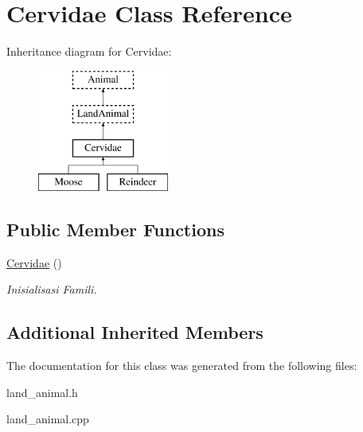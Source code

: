 \hypertarget{class_cervidae}{}\section{Cervidae Class Reference}
\label{class_cervidae}
Inheritance diagram for Cervidae\+:\begin{figure}[H]
\begin{center}
\leavevmode
\includegraphics[height=4.000000cm]{class_cervidae}
\end{center}
\end{figure}
\subsection*{Public Member Functions}
\begin{DoxyCompactItemize}
\item 
\hyperlink{class_cervidae_afee20eae22ae97f038bf764c4b29e193}{Cervidae} ()\hypertarget{class_cervidae_afee20eae22ae97f038bf764c4b29e193}{}\label{class_cervidae_afee20eae22ae97f038bf764c4b29e193}

\begin{DoxyCompactList}\small\item\em Inisialisasi Famili. \end{DoxyCompactList}\end{DoxyCompactItemize}
\subsection*{Additional Inherited Members}


The documentation for this class was generated from the following files\+:\begin{DoxyCompactItemize}
\item 
land\+\_\+animal.\+h\item 
land\+\_\+animal.\+cpp\end{DoxyCompactItemize}
